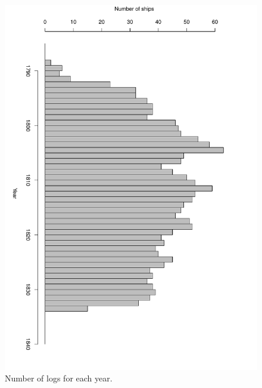 \documentclass[a4paper,11pt]{article}
\begin{document}
\begin{figure}
\begin{center}
\includegraphics[angle=90, width=1.0\textwidth]{../ships_list/ship_count}
\caption{Number of logs for each year.}
\label{ship_count}
\end{center}
\end{figure}
\end{document}
